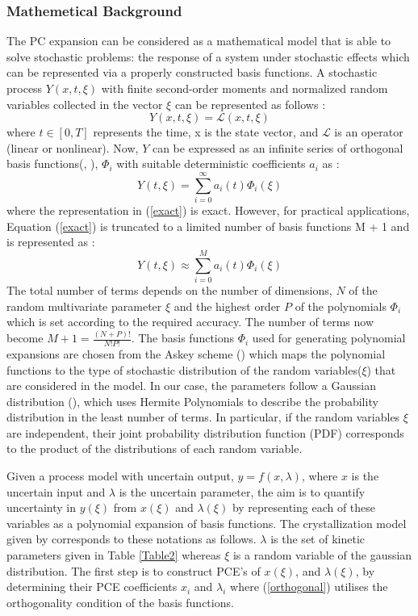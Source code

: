 \documentclass[3p,times,authoryear]{elsarticle}
\begin{document}
\subsubsection{Mathemetical Background}
The PC expansion can be considered as a mathematical model that is able to solve stochastic problems: the response of a system under stochastic effects which can be represented via a properly constructed basis functions. A stochastic process $Y(x,t,\xi)$ with finite second-order moments and normalized random variables collected in the vector $\xi$ can be represented as follows : 
\begin{equation}
Y(x,t,\xi) = \mathcal{L}(x,t,\xi)
\end{equation}
where $t \in [0, T]$ represents the time, x is the state vector, and $\mathcal{L}$ is an operator (linear or nonlinear).
Now, $Y$ can be expressed as an infinite series of orthogonal basis functions(\cite{ghanem}, \cite{ghanem1997}), $\Phi_{i}$ with suitable deterministic coefficients $a_{i}$ as :
\begin{equation} \label{exact}
Y(t,\xi) =  \sum_{i=0}^{\infty} a_{i}(t)\Phi_{i}(\xi)
\end{equation}
where the representation in (\ref{exact}) is exact. However, for practical applications, Equation (\ref{exact}) is
truncated to a limited number of basis functions M + 1 and is represented as :
\begin{equation} \label{approx}
Y(t,\xi) \approx \sum_{i=0}^{M} a_{i}(t)\Phi_{i}(\xi)
\end{equation}
The total number of terms depends on the number of dimensions, $N$ of the random multivariate parameter $\xi$ and the highest order $P$ of the polynomials $\Phi_{i}$ which is set according to the required accuracy. The number of terms now become $ M + 1 = \frac{(N+P)!}{N!P!} $. The basis functions $\Phi_{i}$ used for generating polynomial expansions  are chosen from the Askey scheme (\cite{xiuwiener}) which maps the polynomial functions to the type of stochastic distribution of the random variables($\xi$) that are considered in the model. In our case, the parameters follow a Gaussian distribution (\cite{yenkie}), which uses Hermite Polynomials to describe the probability distribution in the least number of terms. In particular, if the random variables $\xi$ are independent, their joint probability distribution function (PDF) corresponds to the product of the distributions of each random variable. 
\par
Given a process model with uncertain output, $y = f(x,\lambda)$, where $x$ is the uncertain input and $\lambda$ is the uncertain parameter, the aim is to quantify uncertainty in $y(\xi)$ from $x(\xi)$ and $\lambda(\xi)$ by representing each of these variables as a polynomial expansion of basis functions. The crystallization model given by  corresponds to these notations as follows. $\lambda$ is the set of kinetic parameters given in Table \ref{Table2} whereas $\xi$ is a random variable of the gaussian distribution. The first step is to construct PCE’s of $x(\xi)$, and $\lambda(\xi)$, by determining their PCE coefficients $x_{i}$ and $\lambda_{i}$ where (\ref{orthogonal}) utilises the orthogonality condition of the basis functions.
\end{document}
